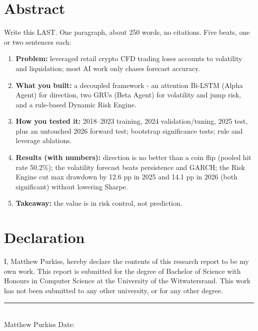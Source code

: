 \chapter*{Abstract}

\begin{guide}
Write this LAST. One paragraph, about 250 words, no citations. Five beats, one or two sentences each:
\begin{enumerate}
  \item \textbf{Problem:} leveraged retail crypto CFD trading loses accounts to volatility and liquidation; most AI work only chases forecast accuracy.
  \item \textbf{What you built:} a decoupled framework - an attention Bi-LSTM (Alpha Agent) for direction, two GRUs (Beta Agent) for volatility and jump risk, and a rule-based Dynamic Risk Engine.
  \item \textbf{How you tested it:} 2018--2023 training, 2024 validation/tuning, 2025 test, plus an untouched 2026 forward test; bootstrap significance tests; rule and leverage ablations.
  \item \textbf{Results (with numbers):} direction is no better than a coin flip (pooled hit rate 50.2\%); the volatility forecast beats persistence and GARCH; the Risk Engine cut max drawdown by 12.6 pp in 2025 and 14.1 pp in 2026 (both significant) without lowering Sharpe.
  \item \textbf{Takeaway:} the value is in risk control, not prediction.
\end{enumerate}
\end{guide}


\chapter*{Declaration}

I, Matthew Purkiss, hereby declare the contents of this research report to be my own work. This report is submitted for the degree of Bachelor of Science with Honours in Computer Science at the University of the Witwatersrand. This work has not been submitted to any other university, or for any other degree.

\vspace{2cm}
\noindent\rule{6cm}{0.4pt}\\
Matthew Purkiss \hfill Date: 

